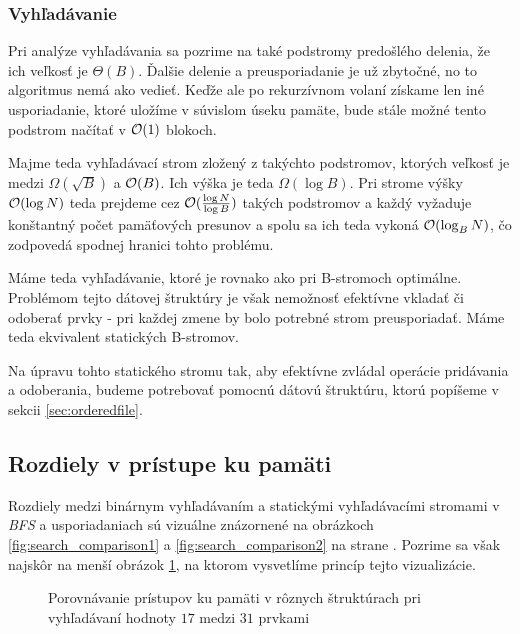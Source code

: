 \subsubsection{Vyhľadávanie} \label{sec:static-search}


Pri analýze vyhľadávania sa pozrime na také podstromy predošlého delenia, že ich veľkosť je $\Theta(B)$. Ďalšie delenie a preusporiadanie je už zbytočné, no to \obliv algoritmus nemá ako vedieť. Keďže ale po rekurzívnom volaní získame len iné usporiadanie, ktoré uložíme v súvislom úseku pamäte, bude stále možné tento podstrom načítať v $\mathcal{O}(1)$ blokoch.

Majme teda vyhľadávací strom zložený z takýchto podstromov, ktorých veľkosť je medzi $\Omega(\sqrt{B})$ a $\mathcal{O}(B)$. Ich výška je teda $\Omega(\log{B})$. Pri strome výšky $\mathcal{O}(\log N)$ teda prejdeme cez $\mathcal{O}(\frac{\log{N}}{\log{B}})$ takých podstromov a každý vyžaduje konštantný počet pamäťových presunov a spolu sa ich teda vykoná $\mathcal{O}(\log_B{N})$, čo zodpovedá spodnej hranici tohto problému.

Máme teda vyhľadávanie, ktoré je rovnako ako pri \aware B-stromoch optimálne. Problémom tejto dátovej štruktúry je však nemožnosť efektívne vkladať či odoberať prvky - pri každej zmene by bolo potrebné strom preusporiadať. Máme teda \obliv ekvivalent statických \aware B-stromov. 

Na úpravu tohto statického stromu tak, aby efektívne zvládal operácie pridávania a odoberania, budeme potrebovať pomocnú dátovú štruktúru, ktorú popíšeme v sekcii \ref{sec:orderedfile}.

\subsection{Rozdiely v prístupe ku pamäti}
Rozdiely medzi binárnym vyhľadávaním a statickými vyhľadávacími stromami v \emph{BFS} a \vEB usporiadaniach sú vizuálne znázornené na obrázkoch \ref{fig:search_comparison1} a \ref{fig:search_comparison2} na strane \pageref{fig:search_comparison1}. Pozrime sa však najskôr na menší obrázok \ref{fig:search_comparison_small}, na ktorom vysvetlíme princíp tejto vizualizácie.

\begin{figure}[h]
    \centering
    \caption{Porovnávanie prístupov ku pamäti v rôznych štruktúrach pri vyhľadávaní hodnoty $17$ medzi $31$ prvkami}
    \label{fig:search_comparison_small}
\end{figure}

